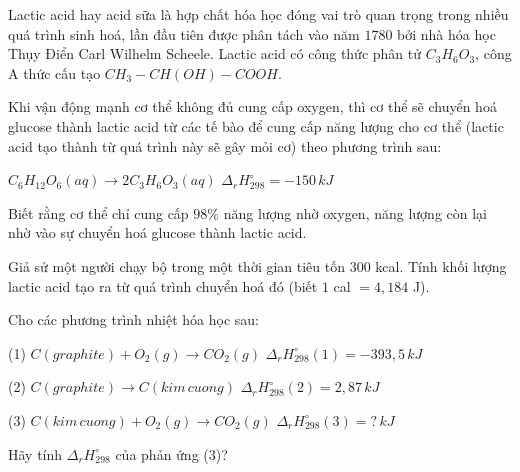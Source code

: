 \documentclass[Main.tex]{subfiles}
\begin{document}
	\begin{bt} Lactic acid hay acid sữa là hợp chất hóa học đóng vai trò quan trọng trong nhiều quá trình sinh hoá, lần đầu tiên được phân tách vào năm $1780$ bởi nhà hóa học Thụy Điển Carl Wilhelm Scheele. Lactic acid có công thức phân tử $C_3H_6O_3$, công A thức cấu tạo $CH_3-CH(OH)-COOH$.
		
		Khi vận động mạnh cơ thể không đủ cung cấp oxygen, thì cơ thể sẽ chuyển hoá glucose thành lactic acid từ các tế bào để cung cấp năng lượng cho cơ thể (lactic acid tạo thành từ quá trình này sẽ gây mỏi cơ) theo phương trình sau:
		
		$C_6H_{12}O_6(aq) \longrightarrow 2C_3H_6O_3(aq)\,\, \Delta_r H_{298}^\circ = -150\, kJ$
		
		Biết rằng cơ thể chỉ cung cấp $98\%$ năng lượng nhờ oxygen, năng lượng còn lại nhờ vào sự chuyển hoá glucose thành lactic acid.
		
		Giả sử một người chạy bộ trong một thời gian tiêu tốn $300$ kcal. Tính khối lượng lactic acid tạo ra từ quá trình chuyển hoá đó (biết $1$ cal $= 4{,}184$ J).
	\end{bt}
	\begin{bt}
		Cho các phương trình nhiệt hóa học sau:
		
		(1) $C(graphite) + O_2(g) \longrightarrow CO_2(g)\,\, \Delta_r H_{298}^\circ (1) = -393{,}5\, kJ$
		
		(2) $C(graphite) \longrightarrow C(kim\, cuong)\,\, \Delta_r H_{298}^\circ (2) = 2{,}87\, kJ$
		
		(3) $C(kim\, cuong) + O_2(g) \longrightarrow CO_2(g)\,\, \Delta_r H_{298}^\circ (3) = ?\, kJ$
		
		Hãy tính $\Delta_r H_{298}^\circ$ của phản ứng (3)?
	\end{bt}
	
\end{document}

